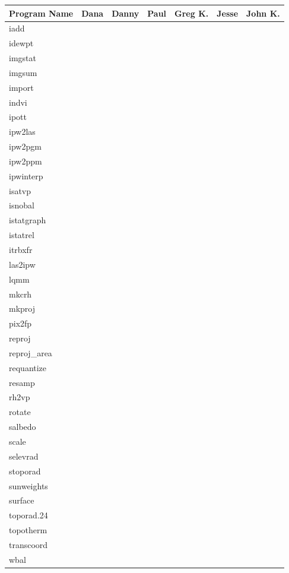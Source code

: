 \begin{tabular}{||l|l|l|l|l|l|l||} \hline
Program Name & Dana & Danny & Paul & Greg K. & Jesse & John K. \\ \hline\hline
iadd & & & & & & \\ \hline
idewpt & & & & & & \\ \hline
imgstat & & & & & & \\ \hline
imgsum & & & & & & \\ \hline
import & & & & & & \\ \hline
indvi & & & & & & \\ \hline
ipott & & & & & & \\ \hline
ipw2las & & & & & & \\ \hline
ipw2pgm & & & & & & \\ \hline
ipw2ppm & & & & & & \\ \hline
ipwinterp & & & & & & \\ \hline
isatvp & & & & & & \\ \hline
isnobal & & & & & & \\ \hline
istatgraph & & & & & & \\ \hline
istatrel & & & & & & \\ \hline
itrbxfr & & & & & & \\ \hline
las2ipw & & & & & & \\ \hline
lqmm & & & & & & \\ \hline
mkcrh & & & & & & \\ \hline
mkproj & & & & & & \\ \hline
pix2fp & & & & & & \\ \hline
reproj & & & & & & \\ \hline
reproj\_area & & & & & & \\ \hline
requantize & & & & & & \\ \hline
resamp & & & & & & \\ \hline
rh2vp & & & & & & \\ \hline
rotate & & & & & & \\ \hline
salbedo & & & & & & \\ \hline
scale & & & & & & \\ \hline
selevrad & & & & & & \\ \hline
stoporad & & & & & & \\ \hline
sunweights & & & & & & \\ \hline
surface & & & & & & \\ \hline
toporad.24 & & & & & & \\ \hline
topotherm & & & & & & \\ \hline
transcoord & & & & & & \\ \hline
wbal & & & & & & \\ \hline
\end{tabular}



